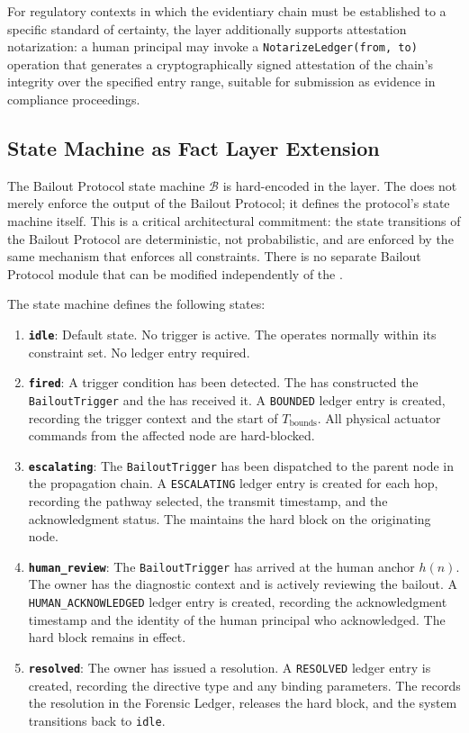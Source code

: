For regulatory contexts in which the evidentiary chain must be established to a specific standard of certainty, the \fact{} layer additionally supports attestation notarization: a human principal may invoke a \texttt{NotarizeLedger(from, to)} operation that generates a cryptographically signed attestation of the chain's integrity over the specified entry range, suitable for submission as evidence in compliance proceedings.

\subsection{State Machine as Fact Layer Extension}
\label{sec:state-machine}

The Bailout Protocol state machine $\mathcal{B}$ is hard-encoded in the \fact{} layer. The \fact{} does not merely enforce the output of the Bailout Protocol; it defines the protocol's state machine itself. This is a critical architectural commitment: the state transitions of the Bailout Protocol are deterministic, not probabilistic, and are enforced by the same mechanism that enforces all \fact{} constraints. There is no separate Bailout Protocol module that can be modified independently of the \fact{}.

The state machine defines the following states:

\begin{enumerate}
\item \textbf{\texttt{idle}}: Default state. No trigger is active. The \bounds{} operates normally within its constraint set. No ledger entry required.
\item \textbf{\texttt{fired}}: A trigger condition has been detected. The \bounds{} has constructed the \texttt{BailoutTrigger} and the \fact{} has received it. A \texttt{BOUNDED} ledger entry is created, recording the trigger context and the start of $T_{\text{bounds}}$. All physical actuator commands from the affected node are hard-blocked.
\item \textbf{\texttt{escalating}}: The \texttt{BailoutTrigger} has been dispatched to the parent node in the propagation chain. A \texttt{ESCALATING} ledger entry is created for each hop, recording the pathway selected, the transmit timestamp, and the acknowledgment status. The \fact{} maintains the hard block on the originating node.
\item \textbf{\texttt{human\_review}}: The \texttt{BailoutTrigger} has arrived at the \purpose{} human anchor $h(n)$. The \purpose{} owner has the diagnostic context and is actively reviewing the bailout. A \texttt{HUMAN\_ACKNOWLEDGED} ledger entry is created, recording the acknowledgment timestamp and the identity of the human principal who acknowledged. The hard block remains in effect.
\item \textbf{\texttt{resolved}}: The \purpose{} owner has issued a resolution. A \texttt{RESOLVED} ledger entry is created, recording the directive type and any binding parameters. The \fact{} records the resolution in the Forensic Ledger, releases the hard block, and the system transitions back to \texttt{idle}.
\end{enumerate}

